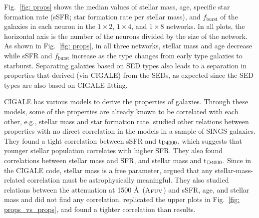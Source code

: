         Fig.~\ref{fig: props} shows the median values of stellar mass, age, specific star formation rate (sSFR; star formation rate per stellar mass), and $f_\mathrm{burst}$ of the galaxies in each neuron in the $1\times2$, $1\times4$, and $1\times8$ networks.
        In all plots, the horizontal axis is the number of the neurons divided by the size of the network.%
%        
        As shown in Fig.~\ref{fig: props}, in all three networks, stellar mass and age decrease while sSFR and $f_\mathrm{burst}$ increase as the type changes from early type galaxies to starburst. 
        Separating galaxies based on SED types also leads to a separation in properties that derived (via {\sc CIGALE}) from the SEDs, as expected since the SED types are also based on {\sc CIGALE} fitting. 
    
        
        {\sc CIGALE} has various models to derive the properties of galaxies.
        Through these models, some of the properties are already known to be correlated with each other, e.g., stellar mass and star formation rate.
         studied other relations between properties with no direct correlation in the models in a sample of SINGS galaxies.
        They found a tight correlation between sSFR and t$_{\rm {D4000}}$, which suggests that younger stellar population correlates with higher SFR.
        They also found correlations between stellar mass and SFR, and stellar mass and t$_{\rm {D4000}}$.
        Since in the {\sc CIGALE} code, stellar mass is a free parameter,  argued that any stellar-mass-related correlation must be astrophysically meaningful. 
        They also studied relations between the attenuation at 1500 \AA~(A$_{\rm {FUV}}$) and sSFR, age, and stellar mass and did not find any correlation.
         replicated the upper plots in Fig.~\ref{fig: props_vs_props}, and found a tighter correlation than  results. 
        
